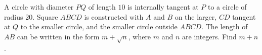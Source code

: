 A circle with diameter $PQ$ of length $10$ is internally tangent at $P$ to a circle of radius $20$. Square $ABCD$ is constructed with $A$ and $B$ on the larger, $CD$ tangent at $Q$ to the smaller circle, and the smaller circle outside $ABCD$. The length of $AB$ can be written in the form $m+\sqrt{n}$, where $m$ and $n$ are integers. Find $m+n$.
